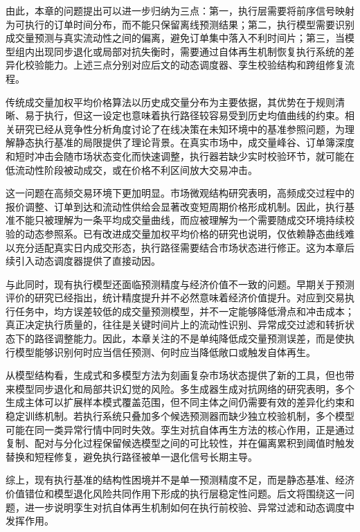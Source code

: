 由此，本章的问题提出可以进一步归纳为三点：第一，执行层需要将前序信号映射为可执行的订单时间分布，而不能只保留离线预测结果；第二，执行模型需要识别成交量预测与真实流动性之间的偏离，避免订单集中落入不利时间片；第三，当模型组内出现同步退化或局部对抗失衡时，需要通过自体再生机制恢复执行系统的差异化校验能力。上述三点分别对应后文的动态调度器、孪生校验结构和跨组修复流程。

传统成交量加权平均价格算法以历史成交量分布为主要依据，其优势在于规则清晰、易于执行，但这一设定也意味着执行路径较容易受到历史均值曲线的约束。相关研究已经从竞争性分析角度讨论了在线决策在未知环境中的基准参照问题，为理解静态执行基准的局限提供了理论背景\cite{kakade2004competitive}。在真实市场中，成交量峰谷、订单簿深度和短时冲击会随市场状态变化而快速调整，执行器若缺少实时校验环节，就可能在低流动性阶段被动成交，或在价格不利区间放大交易冲击。

这一问题在高频交易环境下更加明显。市场微观结构研究表明，高频成交过程中的报价调整、订单到达和流动性供给会显著改变短周期价格形成机制\cite{goodhart1997high}。因此，执行基准不能只被理解为一条平均成交量曲线，而应被理解为一个需要随成交环境持续校验的动态参照系。已有改进成交量加权平均价格的研究也说明，仅依赖静态曲线难以充分适配真实日内成交形态，执行路径需要结合市场状态进行修正\cite{bialkowski2008improving}。这为本章后续引入动态调度器提供了直接动因。

与此同时，现有执行模型还面临预测精度与经济价值不一致的问题。早期关于预测评价的研究已经指出，统计精度提升并不必然意味着经济价值提升\cite{leitch1991economic}。对应到交易执行任务中，均方误差较低的成交量预测模型，并不一定能够降低滑点和冲击成本；真正决定执行质量的，往往是关键时间片上的流动性识别、异常成交过滤和转折状态下的路径调整能力。因此，本章关注的不是单纯降低成交量预测误差，而是使执行模型能够识别何时应当信任预测、何时应当降低敞口或触发自体再生。

从模型结构看，生成式和多模型方法为刻画复杂市场状态提供了新的工具，但也带来模型同步退化和局部共识幻觉的风险。多生成器生成对抗网络的研究表明，多个生成主体可以扩展样本模式覆盖范围，但不同主体之间仍需要有效的差异化约束和稳定训练机制\cite{ghosh2018multi}。若执行系统只叠加多个候选预测器而缺少独立校验机制，多个模型可能在同一类异常行情中同时失效。孪生对抗自体再生方法的核心作用，正是通过复制、配对与分化过程保留候选模型之间的可比较性，并在偏离累积到阈值时触发替换和短程修复，避免执行路径被单一退化信号长期主导。

综上，现有执行基准的结构性困境并不是单一预测精度不足，而是静态基准、经济价值错位和模型退化风险共同作用下形成的执行层稳定性问题。后文将围绕这一问题，进一步说明孪生对抗自体再生机制如何在执行前校验、异常过滤和动态调度中发挥作用。



